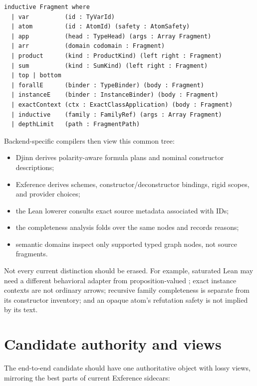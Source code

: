 \documentclass[10pt,letterpaper,oneside]{report}
\newcommand{\code}[1]{\texttt{\detokenize{#1}}}
\begin{document}
\begin{lstlisting}[language=Leanish]
inductive Fragment where
  | var          (id : TyVarId)
  | atom         (id : AtomId) (safety : AtomSafety)
  | app          (head : TypeHead) (args : Array Fragment)
  | arr          (domain codomain : Fragment)
  | product      (kind : ProductKind) (left right : Fragment)
  | sum          (kind : SumKind) (left right : Fragment)
  | top | bottom
  | forallE      (binder : TypeBinder) (body : Fragment)
  | instanceE    (binder : InstanceBinder) (body : Fragment)
  | exactContext (ctx : ExactClassApplication) (body : Fragment)
  | inductive    (family : FamilyRef) (args : Array Fragment)
  | depthLimit   (path : FragmentPath)
\end{lstlisting}

Backend-specific compilers then view this common tree:

\begin{itemize}
  \item Djinn derives polarity-aware formula plans and nominal constructor descriptions;
  \item Exference derives schemes, constructor/deconstructor bindings, rigid scopes, and provider choices;
  \item the Lean lowerer consults exact source metadata associated with IDs;
  \item the completeness analysis folds over the same nodes and records reasons;
  \item semantic domains inspect only supported typed graph nodes, not source fragments.
\end{itemize}

Not every current \code{Frag} distinction should be erased. For example, saturated Lean \code{Prod} may need a different behavioral adapter from proposition-valued \code{And}; exact instance contexts are not ordinary arrows; recursive family completeness is separate from its constructor inventory; and an opaque atom's refutation safety is not implied by its text.

\section{Candidate authority and views}

The end-to-end candidate should have one authoritative object with lossy views, mirroring the best parts of current Exference sidecars:
\end{document}
